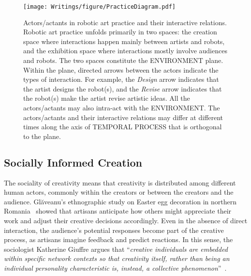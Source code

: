 \begin{figure*}[htbp]
    \centering
    \texttt{[image: Writings/figure/PracticeDiagram.pdf]}
    \caption{Actors/actants in robotic art practice and their interactive relations. Robotic art practice unfolds primarily in two spaces: the creation space where interactions happen mainly between artists and robots, and the exhibition space where interactions mostly involve audiences and robots. The two spaces constitute the ENVIRONMENT plane. Within the plane, directed arrows between the actors indicate the types of interaction. For example, the \textit{Design} arrow indicates that the artist designs the robot(s), and the \textit{Revise} arrow indicates that the robot(s) make the artist revise artistic ideas. All the actors/actants may also intra-act with the ENVIRONMENT. The actors/actants and their interactive relations may differ at different times along the axis of TEMPORAL PROCESS that is orthogonal to the plane.}
    \label{PracticeDiagram}
\end{figure*}

\subsection{Socially Informed Creation}

The sociality of creativity means that creativity is distributed among different human actors, commonly within the creators or between the creators and the audience. Glăveanu’s ethnographic study on Easter egg decoration in northern Romania~\cite{glaveanu_distributed_2014} showed that artisans anticipate how others might appreciate their work and adjust their creative decisions accordingly. Even in the absence of direct interaction, the audience’s potential responses become part of the creative process, as artisans imagine feedback and predict reactions. In this sense, the sociologist Katherine Giuffre argues that ``\textit{creative individuals are embedded within specific network contexts so that creativity itself, rather than being an individual personality characteristic is, instead, a collective phenomenon}''~\cite[p. 1]{giuffre2012collective}.

